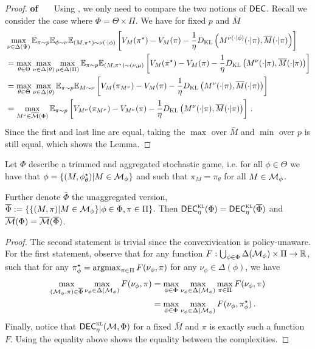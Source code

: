 \begin{proof}\textbf{of \ \ }
Using , we only need to compare the two notions of $\mathsf{DEC}$.
Recall we consider the case where $\Phi=\Theta\times\Pi$.
    We have for fixed $p$ and $\bar M$
    \begin{align*}
    &\max_{\nu\in \Delta(\Psi)}   \E_{\pi\sim p} \E_{\phi\sim \nu}  \E_{(M,\pi^\star)\sim \nu(\cdot|\phi)} \left[V_{M}(\pi^\star) - V_{M}(\pi) - \frac{1}{\eta}  \KL\left( M^{\nu(\cdot|\phi)}(\cdot|\pi), \Bar{M}(\cdot|\pi) \right)\right]\\
    &=\max_{\theta\in\Theta}\max_{\nu\in \Delta(\theta)}\max_{\mu\in\Delta(\Pi)}   \E_{\pi\sim p}  \E_{(M,\pi^\star)\sim (\nu,\mu)} \left[V_{M}(\pi^\star) - V_{M}(\pi) - \frac{1}{\eta}  \KL\left( M^{\nu}(\cdot|\pi), \Bar{M}(\cdot|\pi) \right)\right]\\
    &=\max_{\theta\in\Theta}\max_{\nu\in \Delta(\theta)}\E_{\pi\sim p}  \E_{M\sim \nu} \left[V_{M}(\pi_{M^\nu}) - V_{M}(\pi) - \frac{1}{\eta}  \KL\left( M^{\nu}(\cdot|\pi), \Bar{M}(\cdot|\pi) \right)\right]\\
    &=\max_{M^\nu\in\bar\calM(\Phi)}\E_{\pi\sim p}  \left[V_{M^\nu}(\pi_{M^\nu}) - V_{M^\nu}(\pi) - \frac{1}{\eta}  \KL\left( M^{\nu}(\cdot|\pi), \Bar{M}(\cdot|\pi) \right)\right]\,.
    \end{align*}
    Since the first and last line are equal, taking the $\max$ over $\bar M$ and $\min$ over $p$ is still equal, which shows the Lemma.
\end{proof}

\begin{lemma}\label{lem: trimming}
Let $\Phi$ describe a trimmed and aggregated stochastic game, i.e. for all $\phi\in\Theta$ we have that $\phi=\{(M,\phi^\star_\theta) | M\in \mathcal{M}_\phi\}$ and such that $\pi_{M}=\pi_{\theta}$ for all $M\in\mathcal{M}_{\phi}$.

Further denote $\bar\Phi$ the unaggregated version, 
$\overline{\Phi} := \{\{(M,\pi)|M\in\mathcal{M}_{\phi}\}|\phi\in\Phi,\pi\in\Pi\}$.
Then
$\mathsf{DEC}_{\eta}^{\textsc{kl}}(\Phi)=\mathsf{DEC}_{\eta}^{\textsc{kl}}(\overline{\Phi})$ and $\overline{\mathcal{M}}(\Phi)=\overline{\mathcal{M}}(\overline{\Phi})$.
\end{lemma}
\begin{proof}
The second statement is trivial since the convexivication is policy-unaware.
For the first statement, observe that for any function $F:\bigcup_{\phi\in\Phi}\Delta(\mathcal{M}_{\phi})\times\Pi\rightarrow \mathbb{R}$, such that for any $\pi^\star_{\phi}=\operatorname*{argmax}_{\pi\in\Pi}F(\nu_\phi,\pi)$ for any $\nu_\phi\in\Delta(\phi)$, we have
\begin{align*}
    \max_{(\mathcal{M}_\phi,\pi)\in\overline{\Phi}}\max_{\nu_\phi\in\Delta(\mathcal{M}_\phi)}F(\nu_{\phi},\pi)&=\max_{\phi\in\Phi}\max_{\nu_\phi\in\Delta(\mathcal{M}_\phi)}\max_{\pi\in\Pi}F(\nu_{\phi},\pi)\\
    &=\max_{\phi\in\Phi}\max_{\nu_\phi\in\Delta(\mathcal{M}_\phi)}F(\nu_{\phi},\pi^\star_\phi)\,.
\end{align*}
Finally, notice that $\mathsf{DEC}_{\eta}^{\textsc{kl}}(\mathcal{M},\Phi)$ for a fixed $\bar M$ and $\pi$ is exactly such a function $F$. Using the equality above shows the equality between the complexities.
\end{proof}


